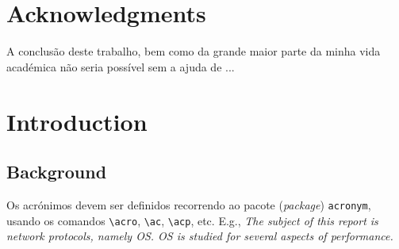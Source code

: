 \documentclass[titlepage,12pt,a4paper,times]{book}
\begin{document}


\clearpage{\thispagestyle{empty}\cleardoublepage}

\frontmatter

\chapter*{Acknowledgments}
\label{chap:ack}

A conclusão deste trabalho, bem como da grande maior parte da minha vida
académica não seria possível sem a ajuda de ...

\clearpage{\thispagestyle{empty}\cleardoublepage}

\tableofcontents

\clearpage{\thispagestyle{empty}\cleardoublepage}

\listoffigures

\begin{acronym}[OS]
\end{acronym}

\clearpage{\thispagestyle{empty}\cleardoublepage}
\listoftables


\begin{acronym}
\end{acronym}

% 

\clearpage{\thispagestyle{empty}\cleardoublepage}

\chapter{Introduction}
\label{chap:intro}

\section{Background}
\label{sec:amb}

Os acrónimos devem ser definidos recorrendo ao pacote (\emph{package})
\texttt{acronym}, usando os comandos \texttt{\textbackslash acro},
\texttt{\textbackslash ac}, \texttt{\textbackslash acp}, etc. E.g., \emph{The
subject of this report is network protocols, namely \ac{OS}.  \ac{OS} is
studied for several aspects of performance.}
\end{document}
